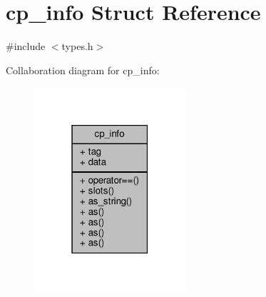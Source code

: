 \hypertarget{structcp__info}{}\section{cp\+\_\+info Struct Reference}
\label{structcp__info}


{\ttfamily \#include $<$types.\+h$>$}



Collaboration diagram for cp\+\_\+info\+:\nopagebreak
\begin{figure}[H]
\begin{center}
\leavevmode
\includegraphics[width=159pt]{structcp__info__coll__graph}
\end{center}
\end{figure}
